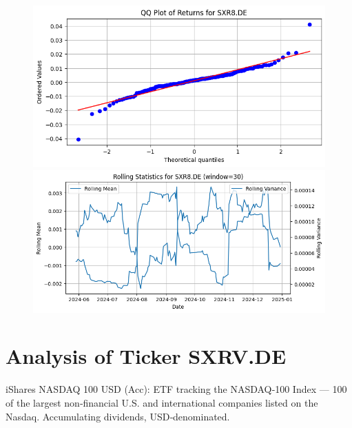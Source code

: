\documentclass{article}%
\begin{document}
%


\begin{figure}[htbp]%
\begin{minipage}{0.31\textwidth}%
\includegraphics[width=\linewidth]{ticker_images/SXR8.DE_qq_plot.png}%
\end{minipage}%
\begin{minipage}{0.31\textwidth}%
\includegraphics[width=\linewidth]{ticker_images/SXR8.DE_rolling_stats.png}%
\end{minipage}%
\end{figure}

%
\section*{Analysis of Ticker SXRV.DE}%
\label{sec:AnalysisofTickerSXRV.DE}%
iShares NASDAQ 100 USD (Acc): ETF tracking the NASDAQ‑100 Index — 100 of the largest non‑financial U.S. and international companies listed on the Nasdaq. Accumulating dividends, USD‑denominated.%
\end{document}
